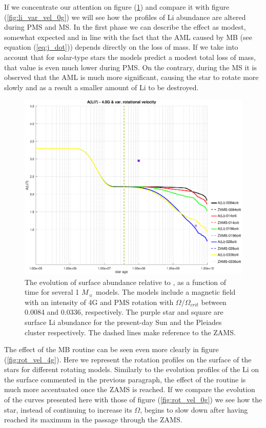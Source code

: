\documentclass[fleqn,usenatbib]{mnras}
\begin{document}
If we concentrate our attention on figure (\ref{fig:li_var_vel_4_0g}) and compare it with figure (\ref{fig:li_var_vel_0g}) we will see how the profiles of Li abundance are altered during PMS and MS. In the first phase we can describe the effect as modest, somewhat expected and in line with the fact that the AML caused by MB (see equation (\ref{eq:j_dot})) depends directly on the loss of mass. If we take into account that for solar-type stars the models predict a modest total loss of mass, that value is even much lower during PMS. On the contrary, during the MS it is observed that the AML is much more significant, causing the star to rotate more slowly and as a result a smaller amount of Li to be destroyed.\par

\begin{figure}
	\includegraphics[trim = 40mm 15mm 20mm 15mm, clip,width=\columnwidth]{figures/li_var_vel_4_0g.eps}
    \caption{The evolution of surface  abundance relative to , as a function of time for several 1 $M_{\sun}$ models. The models include a magnetic field with an intensity of 4G and PMS rotation with $\Omega / \Omega_{crit}$ between 0.0084 and 0.0336, respectively. The purple star and square are surface Li abundance for the present-day Sun \citep{Asplund2009} and the Pleiades cluster \citep{Sestito2005} respectively. The dashed lines make reference to the ZAMS.}
    \label{fig:li_var_vel_4_0g}
\end{figure}

The effect of the MB routine can be seen even more clearly in figure (\ref{fig:rot_vel_4g}). Here we represent the rotation profiles on the surface of the stars for different rotating models. Similarly to the evolution profiles of the Li on the surface commented in the previous paragraph, the effect of the routine is much more accentuated once the ZAMS is reached. If we compare the evolution of the curves presented here with those of figure (\ref{fig:rot_vel_0g}) we see how the star, instead of continuing to increase its $\Omega$, begins to slow down after having reached its maximum in the passage through the ZAMS.\par
\end{document}
